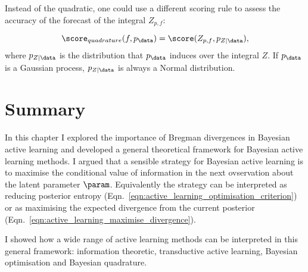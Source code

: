 Instead of the quadratic, one could use a different scoring rule to assess the accuracy of the forecast of the integral  $Z_{p,f}$:

\begin{equation}
	\score_{quadrature}(f,p_\data) = \score(Z_{p,f},p_{Z\vert\data}),
\end{equation}
where $p_{Z\vert\data}$ is the distribution that $p_{\data}$ induces over the integral $Z$. If $p_{\data}$ is a Gaussian process, $p_{Z\vert\data}$ is always a Normal distribution.

\section{Summary}

In this chapter I explored the importance of Bregman divergences in Bayesian active learning and developed a general theoretical framework for Bayesian active learning methods. I argued that a sensible strategy for Bayesian active learning is to maximise the conditional value of information in the next ovservation about the latent parameter $\param$. Equivalently the strategy can be interpreted as reducing posterior entropy (Eqn.\ \eqref{eqn:active_learning_optimisation_criterion}) or as maximising the expected divergence from the current posterior (Eqn.\ \eqref{eqn:active_learning_maximise_divergence}).

I showed how a wide range of active learning methods can be interpreted in this general framework: information theoretic, transductive active learning, Bayesian optimisation and Bayesian quadrature.